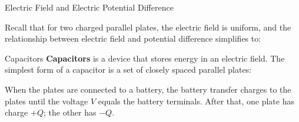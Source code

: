 \documentclass[12pt,aspectratio=169]{beamer}
\begin{document}
\begin{frame}{Electric Field and Electric Potential Difference}
  \begin{center}
  \end{center}
  Recall that for two charged parallel plates, the electric field is uniform,
  and the relationship between electric field and potential difference
  simplifies to:

\end{frame}



\begin{frame}{Capacitors}
  \textbf{Capacitors} is a device that stores energy in an electric field. The
  simplest form of a capacitor is a set of closely spaced parallel plates:
  \begin{center}
  \end{center}
  When the plates are connected to a battery, the battery transfer charges to
  the plates until the voltage $V$ equals the battery terminals. After that,
  one plate has charge $+Q$; the other has $-Q$.
\end{frame}
\end{document}
